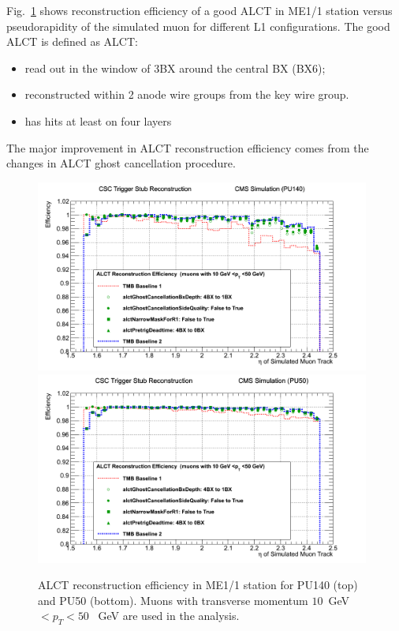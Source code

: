 Fig.~\ref{fig:ALCT_improvements_ALCT_recoEff} shows reconstruction efficiency of a good ALCT in ME1/1 station versus pseudorapidity of the simulated muon for different L1 configurations. The good ALCT is defined as ALCT:
\begin{itemize}
	\item read out in the window of 3BX around the central BX (BX6);
	\item reconstructed within 2 anode wire groups from the key wire group.
	\item has hits at least on four layers
\end{itemize}

The major improvement in ALCT reconstruction efficiency comes from the changes in ALCT ghost cancellation procedure.

\begin{figure}[p]
\includegraphics[width=0.98\textwidth]{figures/ALCT_improvements_ALCT_recoEff.png}
\includegraphics[width=0.98\textwidth]{figures/ALCT_improvements_ALCT_recoEff_PU50.png}
\caption{ALCT reconstruction efficiency in ME1/1 station for PU140 (top) and PU50 (bottom). Muons with transverse momentum $10$~GeV$<p_T<50$~ GeV are used in the analysis.}
\label{fig:ALCT_improvements_ALCT_recoEff}
\end{figure}